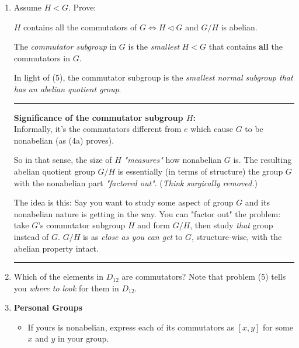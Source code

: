 \begin{enumerate}
    \item Assume \( H < G \). Prove:
    
    \( H \) contains all the commutators of \( G \iff H \triangleleft G \) and \( G/H \) is abelian. \\ \steezybreak

    \begin{definition}
        The \textit{commutator subgroup} in \( G \) is the \textit{smallest} \( H < G \) that contains \textbf{all} the commutators in \( G \).
    \end{definition}
    
    In light of (5), the commutator subgroup is the \textit{smallest normal subgroup that has an abelian quotient group}. \\ \steezybreak
    
    \noindent \rule{\textwidth}{0.4pt}
    
    \textbf{Significance of the commutator subgroup \( H \):} \\
    Informally, it's the commutators different from \( e \) which cause \( G \) to be nonabelian (as (4a) proves). 
    
    So in that sense, the size of \( H \) \textit{"measures"} how nonabelian \( G \) is. The resulting abelian quotient group \( G/H \) is essentially (in terms of structure) the group \( G \) with the nonabelian part \textit{"factored out"}. (\textit{Think surgically removed.}) \\ \steezybreak
    
    The idea is this: Say you want to study some aspect of group \( G \) and its nonabelian nature is getting in the way. You can "factor out" the problem: take \( G \)'s commutator subgroup \( H \) and form \( G/H \), then study \textit{that} group instead of \( G \). \( G/H \) is as \textit{close as you can get} to \( G \), structure-wise, with the abelian property intact. \\ \steezybreak
    \noindent \rule{\textwidth}{0.4pt}
    \newpage

    \item Which of the elements in \( D_{12} \) are commutators? Note that problem (5) tells you \textit{where to look} for them in \( D_{12} \). \\ \steezybreak
    
    \item \textbf{Personal Groups}
    
    \begin{itemize}
        \item If yours is nonabelian, express each of its commutators as \( [x,y] \) for some \( x \) and \( y \) in your group.
        

\end{itemize}
\end{enumerate}
